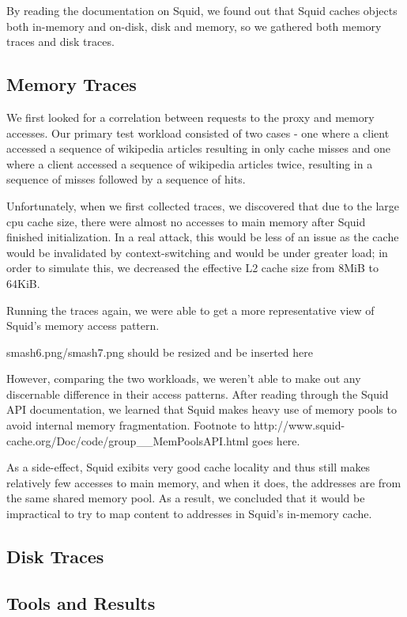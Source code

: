\documentclass[11pt, oneside]{article}
\begin{document}
By reading the documentation on Squid, we found out that Squid caches objects
both in-memory and on-disk, disk and memory, so we gathered both memory traces
and disk traces.

\subsection{Memory Traces}
We first looked for a correlation between requests to the proxy and memory
accesses. Our primary test workload consisted of two cases - one where
a client accessed a sequence of wikipedia articles resulting in only cache
misses and one where a client accessed a sequence of wikipedia articles
twice, resulting in a sequence of misses followed by a sequence of hits.

Unfortunately, when we first collected traces, we discovered that due to
the large cpu cache size, there were almost no accesses to main memory
after Squid finished initialization. In a real attack, this would be less
of an issue as the cache would be invalidated by context-switching and
would be under greater load; in order to simulate this, we decreased the
effective L2 cache size from 8MiB to 64KiB.

Running the traces again, we were able to get a more representative view
of Squid's memory access pattern.

smash6.png/smash7.png should be resized and be inserted here

However, comparing the two workloads,
we weren't able to make out any discernable difference in their access
patterns. After reading through the Squid API documentation, we learned
that Squid makes heavy use of memory pools to avoid internal memory
fragmentation. Footnote to http://www.squid-cache.org/Doc/code/group__MemPoolsAPI.html goes here.


 As a side-effect, Squid exibits very good cache locality
and thus still makes relatively few accesses to main memory, and when
it does, the addresses are from the same shared memory pool. As a result,
we concluded that it would be impractical to try to map content to addresses
in Squid's in-memory cache.

\subsection{Disk Traces}

\subsection{Tools and Results}
\end{document}
